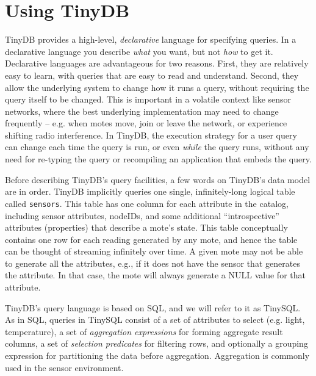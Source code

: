 \documentclass[11pt]{article}
\begin{document}
\section{Using TinyDB}
\label{sec:queries}
TinyDB provides a high-level, {\em declarative}
language for specifying queries.  In a declarative language you
describe {\em what} you want, but not {\em how} to get it.
Declarative languages are advantageous for two reasons.  First, they
are relatively easy to learn, with queries that are easy to read and
understand.  Second, they allow the underlying system to change how it
runs a query, without requiring the query itself to be changed.  This
is important in a volatile context like sensor networks, where the
best underlying implementation may need to change frequently --
e.g. when motes move, join or leave the network, or experience
shifting radio interference.  In TinyDB, the execution strategy for a
user query can change each time the query is run, or even {\em while}
the query runs, without any need for re-typing the query or
recompiling an application that embeds the query.

Before describing TinyDB's query facilities, a few words on
TinyDB's data model are in order.  TinyDB implicitly queries one
single, infinitely-long logical table called {\tt sensors}.  This
table has one column for each attribute in the catalog, including
sensor attributes, nodeIDs, and some additional ``introspective''
attributes (properties) that describe a mote's state.  This table conceptually
contains one row for each reading generated by any mote, and hence the
table can be thought of streaming infinitely over time.  A given mote
may not be able to generate all the attributes, e.g., if it does not
have the sensor that generates the attribute.  In that case, the mote
will always generate a NULL value for that attribute.

TinyDB's query language is based on SQL, and we will refer
to it as TinySQL.  As in SQL, queries in
TinySQL consist of a set of
attributes to select (e.g. light, temperature), a set
of {\it aggregation expressions}
for forming aggregate result columns, a set of {\it
selection predicates} for filtering
rows, and optionally a grouping expression for
partitioning the data before aggregation.  Aggregation
is commonly used in the sensor environment.  
\end{document}
